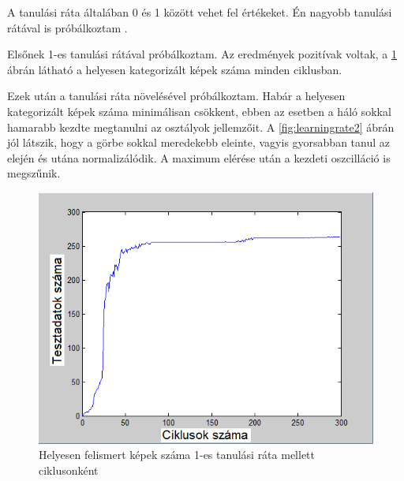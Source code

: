 A tanulási ráta általában 0 és 1 között vehet fel értékeket. Én nagyobb tanulási rátával is próbálkoztam \cite{10}. 

Elsőnek 1-es tanulási rátával próbálkoztam. Az eredmények pozitívak voltak, a \ref{fig:learningrate1} ábrán látható a helyesen kategorizált képek száma minden ciklusban. 

Ezek után a tanulási ráta növelésével próbálkoztam. Habár a helyesen kategorizált képek száma minimálisan csökkent, ebben az esetben a háló sokkal hamarabb kezdte megtanulni az osztályok jellemzőit. A \ref{fig:learningrate2} ábrán jól látszik, hogy a görbe sokkal meredekebb eleinte, vagyis gyorsabban tanul az elején és utána normalizálódik. A maximum elérése után a kezdeti oszcilláció is megszűnik.

\begin{figure}[h]
\centering

\includegraphics[scale=0.4]{images/Teszt2_}
\caption{Helyesen felismert képek száma 1-es tanulási ráta mellett ciklusonként}

\label{fig:learningrate1}
\end{figure}

